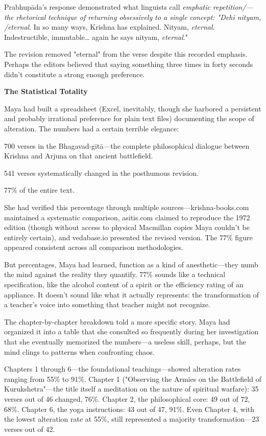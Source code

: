 \documentclass[12pt,twoside]{book}
\begin{document}
Prabhupāda's response demonstrated what linguists call \emph{emphatic repetition/—the rhetorical technique of returning obsessively to a single concept: "Dehi nityam, /eternal}. In so many ways, Krishna has explained. Nityam, \emph{eternal}. Indestructible, immutable\ldots{} again he says nityam, \emph{eternal}."

The revision removed "eternal" from the verse despite this recorded emphasis. Perhaps the editors believed that saying something three times in forty seconds didn't constitute a strong enough preference.

\textbf{\textbf{The Statistical Totality}}

Maya had built a spreadsheet (Excel, inevitably, though she harbored a persistent and probably irrational preference for plain text files) documenting the scope of alteration. The numbers had a certain terrible elegance:

700 verses in the Bhagavad-gītā—the complete philosophical dialogue between Krishna and Arjuna on that ancient battlefield.

541 verses systematically changed in the posthumous revision.

77\% of the entire text.

She had verified this percentage through multiple sources—krishna-books.com maintained a systematic comparison, asitis.com claimed to reproduce the 1972 edition (though without access to physical Macmillan copies Maya couldn't be entirely certain), and vedabase.io presented the revised version. The 77\% figure appeared consistent across all comparison methodologies.

But percentages, Maya had learned, function as a kind of anesthetic—they numb the mind against the reality they quantify. 77\% sounds like a technical specification, like the alcohol content of a spirit or the efficiency rating of an appliance. It doesn't sound like what it actually represents: the transformation of a teacher's voice into something that teacher might not recognize.

The chapter-by-chapter breakdown told a more specific story. Maya had organized it into a table that she consulted so frequently during her investigation that she eventually memorized the numbers—a useless skill, perhaps, but the mind clings to patterns when confronting chaos.

Chapters 1 through 6—the foundational teachings—showed alteration rates ranging from 55\% to 91\%. Chapter 1 ("Observing the Armies on the Battlefield of Kurukshetra"—the title itself a meditation on the nature of spiritual warfare): 35 verses out of 46 changed, 76\%. Chapter 2, the philosophical core: 49 out of 72, 68\%. Chapter 6, the yoga instructions: 43 out of 47, 91\%. Even Chapter 4, with the lowest alteration rate at 55\%, still represented a majority transformation—23 verses out of 42.
\end{document}
